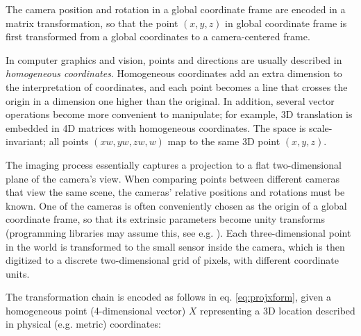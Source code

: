 The camera position and rotation in a global coordinate frame are encoded in a matrix transformation, so that the point $(x,y,z)$ in global coordinate frame is first transformed from a global coordinates to a camera-centered frame.


In computer graphics and vision, points and directions are usually described in \emph{homogeneous coordinates}.
Homogeneous coordinates add an extra dimension to the interpretation of coordinates, and each point becomes a line that crosses the origin in a dimension one higher than the original.
In addition, several vector operations become more convenient to manipulate; for example, 3D translation is embedded in 4D matrices with homogeneous coordinates. \cite{hartley03multiview,heyden2005multiple}
The space is scale-invariant; all points $(xw, yw, zw, w)$ map to the same 3D point $(x, y, z)$.
\cite{dubrofsky2009homography,hartley03multiview}


The imaging process essentially captures a projection to a flat two-dimensional plane of the camera's view.
When comparing points between different cameras that view the same scene, the cameras' relative positions and rotations must be known.
One of the cameras is often conveniently chosen as the origin of a global coordinate frame, so that its extrinsic parameters become unity transforms (programming libraries may assume this, see e.g. \cite{opencv}).
Each three-dimensional point in the world is transformed to the small sensor inside the camera, which is then digitized to a discrete two-dimensional grid of pixels, with different coordinate units.


The transformation chain is encoded as follows in eq. \ref{eq:projxform}, given a homogeneous point (4-dimensional vector) $X$ representing a 3D location described in physical (e.g. metric) coordinates:

